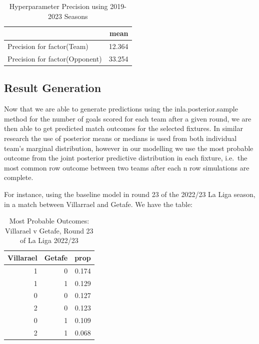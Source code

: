\documentclass[
]{article}
\begin{document}
\begin{table}

\caption{\label{tab:unnamed-chunk-5}Hyperparameter Precision using 2019-2023 Seasons}
\centering
\begin{tabular}[t]{l|r}
\hline
  & mean\\
\hline
Precision for factor(Team) & 12.364\\
\hline
Precision for factor(Opponent) & 33.254\\
\hline
\end{tabular}
\end{table}

\hypertarget{result-generation}{%
\subsection{Result Generation}\label{result-generation}}

Now that we are able to generate predictions using the
inla.posterior.sample method for the number of goals scored for each
team after a given round, we are then able to get predicted match
outcomes for the selected fixtures. In similar research the use of
posterior means or medians is used from both individual team's marginal
distribution, however in our modelling we use the most probable outcome
from the joint posterior predictive distribution in each fixture,
i.e.~the most common row outcome between two teams after each n row
simulations are complete.

For instance, using the baseline model in round 23 of the 2022/23 La
Liga season, in a match between Villarrael and Getafe. We have the
table:

\begin{table}[!h]

\caption{\label{tab:unnamed-chunk-6}Most Probable Outcomes: Villarael v Getafe, Round 23 of La Liga 2022/23}
\centering
\begin{tabular}[t]{r|r|r}
\hline
Villarael & Getafe & prop\\
\hline
1 & 0 & 0.174\\
\hline
1 & 1 & 0.129\\
\hline
0 & 0 & 0.127\\
\hline
2 & 0 & 0.123\\
\hline
0 & 1 & 0.109\\
\hline
2 & 1 & 0.068\\
\hline
\end{tabular}
\end{table}
\end{document}
